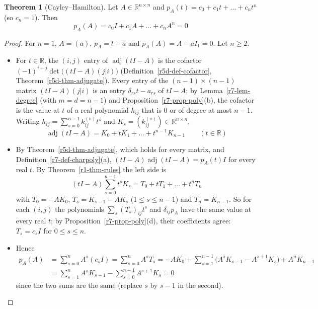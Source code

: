 \documentclass[12pt]{article}
\newcommand{\R}{\mathbb R}
\theoremstyle{definition}
\newtheorem{theorem}{Theorem}
\begin{document}
\begin{theorem}[Cayley--Hamilton]\label{r7-thm-cayley-hamilton}
Let \(A\in\R^{n\times n}\) and \(p_A(t)=c_0+c_1t+\dots+c_nt^n\) (so \(c_n=1\)). Then
\[
p_A(A)=c_0I+c_1A+\dots+c_nA^n=0
\]
\end{theorem}
\begin{proof}
For \(n=1\), \(A=(a)\), \(p_A=t-a\) and \(p_A(A)=A-aI_1=0\). Let \(n\geqslant2\).
\begin{itemize}
\item For \(t\in\R\), the \((i,j)\) entry of \(\operatorname{adj}(tI-A)\) is the cofactor
\((-1)^{i+j}\det\bigl((tI-A)(j|i)\bigr)\) (Definition~\ref{r5d-def-cofactor}, Theorem~\ref{r5d-thm-adjugate}). Every entry
of the \((n-1)\times(n-1)\) matrix \((tI-A)(j|i)\) is an entry \(\delta_{rs}t-a_{rs}\) of \(tI-A\); by
Lemma~\ref{r7-lem-degree} (with \(m=d=n-1\)) and Proposition~\ref{r7-prop-poly}(b), the cofactor is the value at \(t\)
of a real polynomial \(h_{ij}\) that is \(0\) or of degree at most \(n-1\). Writing
\(h_{ij}=\sum_{s=0}^{n-1}k^{(s)}_{ij}t^s\) and \(K_s=(k^{(s)}_{ij})\in\R^{n\times n}\),
\[
\operatorname{adj}(tI-A)=K_0+tK_1+\dots+t^{n-1}K_{n-1}\qquad(t\in\R)
\]
\item By Theorem~\ref{r5d-thm-adjugate}, which holds for every matrix, and Definition~\ref{r7-def-charpoly}(a),
\((tI-A)\operatorname{adj}(tI-A)=p_A(t)I\) for every real \(t\). By Theorem~\ref{r1-thm-rules} the left side is
\[
(tI-A)\sum_{s=0}^{n-1}t^sK_s=T_0+tT_1+\dots+t^nT_n
\]
with \(T_0=-AK_0\), \(T_s=K_{s-1}-AK_s\) (\(1\leqslant s\leqslant n-1\)) and \(T_n=K_{n-1}\). So for each \((i,j)\) the polynomials \(\sum_s(T_s)_{ij}t^s\) and \(\delta_{ij}p_A\) have the same value at every real
\(t\); by Proposition~\ref{r7-prop-poly}(d), their coefficients agree: \(T_s=c_sI\) for \(0\leqslant s\leqslant n\).
\item Hence
\[
\begin{aligned}
p_A(A)&=\sum_{s=0}^nA^s(c_sI)=\sum_{s=0}^nA^sT_s=-AK_0+\sum_{s=1}^{n-1}\bigl(A^sK_{s-1}-A^{s+1}K_s\bigr)+A^nK_{n-1}\\
&=\sum_{s=1}^nA^sK_{s-1}-\sum_{s=0}^{n-1}A^{s+1}K_s=0
\end{aligned}
\]
since the two sums are the same (replace \(s\) by \(s-1\) in the second).\qedhere
\end{itemize}
\end{proof}
\end{document}
